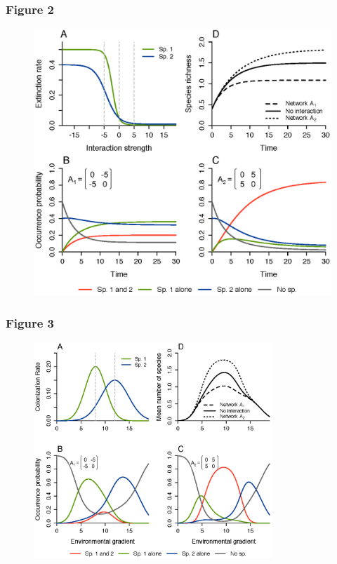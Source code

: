 \subsubsection*{Figure 2}
\begin{figure}[h!]
\centering
\includegraphics[width=\textwidth]{./chapitre1/fig2.eps}
\caption{}
\label{fig2}
\end{figure}

\newpage
%

\subsubsection*{Figure 3}
\begin{figure}[h!]
\centering
\includegraphics[width=0.8\textwidth]{./chapitre1/fig3.eps}
\caption{}
\label{fig3}
\end{figure}

